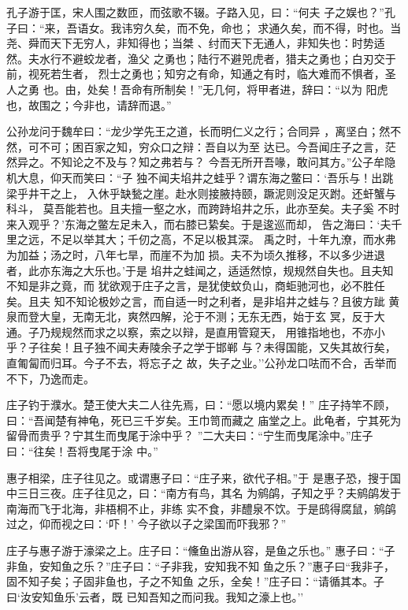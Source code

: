 \documentclass[]{article}
\begin{document}
孔子游于匡，宋人围之数匝，而弦歌不辍。子路入见，曰：``何夫
子之娱也？''孔子曰：``来，吾语女。我讳穷久矣，而不免，命也；
求通久矣，而不得，时也。当尧、舜而天下无穷人，非知得也；当桀
、纣而天下无通人，非知失也：时势适然。夫水行不避蛟龙者，渔父
之勇也；陆行不避兕虎者，猎夫之勇也；白刃交于前，视死若生者，
烈士之勇也；知穷之有命，知通之有时，临大难而不惧者，圣人之勇
也。由，处矣！吾命有所制矣！''无几何，将甲者进，辞曰：``以为
阳虎也，故围之；今非也，请辞而退。''

公孙龙问于魏牟曰：``龙少学先王之道，长而明仁义之行；合同异
，离坚白；然不然，可不可；困百家之知，穷众口之辩：吾自以为至
达已。今吾闻庄子之言，茫然异之。不知论之不及与？知之弗若与？
今吾无所开吾喙，敢问其方。''公子牟隐机大息，仰天而笑曰：``子
独不闻夫埳井之蛙乎？谓东海之鳖曰：`吾乐与！出跳梁乎井干之上，
入休乎缺甃之崖。赴水则接腋持颐，蹶泥则没足灭跗。还虷蟹与科斗，
莫吾能若也。且夫擅一壑之水，而跨跱埳井之乐，此亦至矣。夫子奚
不时来入观乎？'东海之鳖左足未入，而右膝已絷矣。于是逡巡而却，
告之海曰：`夫千里之远，不足以举其大；千仞之高，不足以极其深。
禹之时，十年九潦，而水弗为加益；汤之时，八年七旱，而崖不为加
损。夫不为顷久推移，不以多少进退者，此亦东海之大乐也。'于是
埳井之蛙闻之，适适然惊，规规然自失也。且夫知不知是非之竟，而
犹欲观于庄子之言，是犹使蚊负山，商蚷驰河也，必不胜任矣。且夫
知不知论极妙之言，而自适一时之利者，是非埳井之蛙与？且彼方跐
黄泉而登大皇，无南无北，爽然四解，沦于不测；无东无西，始于玄
冥，反于大通。子乃规规然而求之以察，索之以辩，是直用管窥天，
用锥指地也，不亦小乎？子往矣！且子独不闻夫寿陵余子之学于邯郸
与？未得国能，又失其故行矣，直匍匐而归耳。今子不去，将忘子之
故，失子之业。''公孙龙口呿而不合，舌举而不下，乃逸而走。

庄子钓于濮水。楚王使大夫二人往先焉，曰：``愿以境内累矣！''
庄子持竿不顾，曰：``吾闻楚有神龟，死已三千岁矣。王巾笥而藏之
庙堂之上。此龟者，宁其死为留骨而贵乎？宁其生而曳尾于涂中乎？
''二大夫曰：``宁生而曳尾涂中。''庄子曰：``往矣！吾将曳尾于涂 中。''

惠子相梁，庄子往见之。或谓惠子曰：``庄子来，欲代子相。''于
是惠子恐，搜于国中三日三夜。庄子往见之，曰：``南方有鸟，其名
为鹓鹐，子知之乎？夫鹓鹐发于南海而飞于北海，非梧桐不止，非练
实不食，非醴泉不饮。于是鸱得腐鼠，鹓鹐过之，仰而视之曰：`吓！'
今子欲以子之梁国而吓我邪？''

庄子与惠子游于濠梁之上。庄子曰：``儵鱼出游从容，是鱼之乐也。''
惠子曰∶``子非鱼，安知鱼之乐？''庄子曰：``子非我，安知我不知
鱼之乐？''惠子曰``我非子，固不知子矣；子固非鱼也，子之不知鱼
之乐，全矣！''庄子曰：``请循其本。子曰`汝安知鱼乐'云者，既
已知吾知之而问我。我知之濠上也。''
\end{document}
